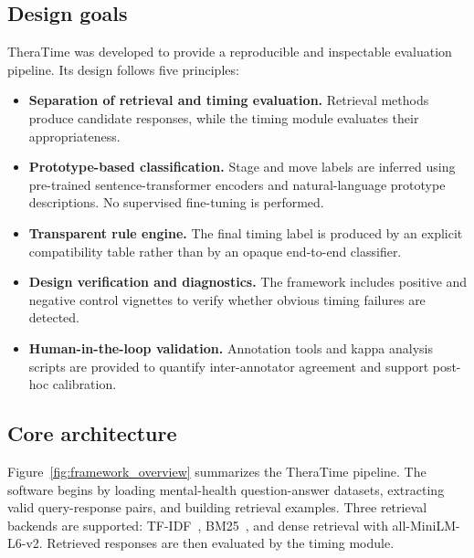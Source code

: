 \documentclass[preprint,12pt,a4paper]{elsarticle}
\begin{document}
\subsection{Design goals}

TheraTime was developed to provide a reproducible and inspectable evaluation pipeline. Its design follows five principles:

\begin{itemize}
    \item \textbf{Separation of retrieval and timing evaluation.} Retrieval methods produce candidate responses, while the timing module evaluates their appropriateness.
    \item \textbf{Prototype-based classification.} Stage and move labels are inferred using pre-trained sentence-transformer encoders and natural-language prototype descriptions. No supervised fine-tuning is performed.
    \item \textbf{Transparent rule engine.} The final timing label is produced by an explicit compatibility table rather than by an opaque end-to-end classifier.
    \item \textbf{Design verification and diagnostics.} The framework includes positive and negative control vignettes to verify whether obvious timing failures are detected.
    \item \textbf{Human-in-the-loop validation.} Annotation tools and kappa analysis scripts are provided to quantify inter-annotator agreement and support post-hoc calibration.
\end{itemize}

\subsection{Core architecture}

Figure~\ref{fig:framework_overview} summarizes the TheraTime pipeline. The software begins by loading mental-health question-answer datasets, extracting valid query-response pairs, and building retrieval examples. Three retrieval backends are supported: TF-IDF~\cite{Salton1988TFIDF}, BM25~\cite{Robertson2009BM25}, and dense retrieval with all-MiniLM-L6-v2. Retrieved responses are then evaluated by the timing module.
\end{document}
